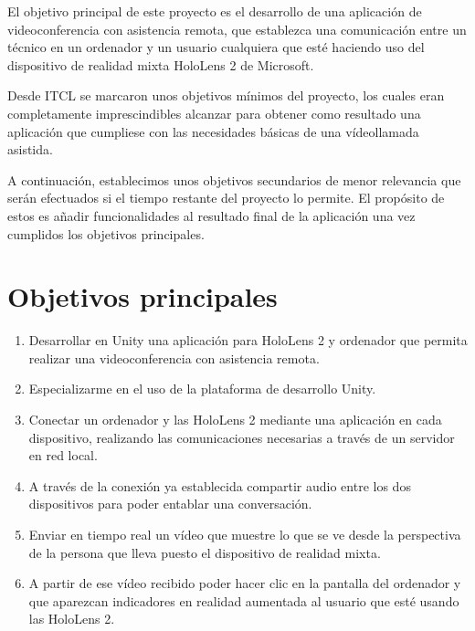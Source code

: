 
El objetivo principal de este proyecto es el desarrollo de una aplicación de videoconferencia con asistencia remota, que establezca una comunicación entre un técnico en un ordenador y un usuario cualquiera que esté haciendo uso del dispositivo de realidad mixta HoloLens 2 de Microsoft.

Desde ITCL se marcaron unos objetivos mínimos del proyecto, los cuales eran completamente imprescindibles alcanzar para obtener como resultado una aplicación que cumpliese con las necesidades básicas de una vídeollamada asistida. 

A continuación, establecimos unos objetivos secundarios de menor relevancia que serán efectuados si el tiempo restante del proyecto lo permite. El propósito de estos es añadir funcionalidades al resultado final de la aplicación una vez cumplidos los objetivos principales. 

\section{Objetivos principales}
\begin{enumerate}
	\item Desarrollar en Unity \cite{unity:unity} una aplicación para HoloLens 2 y ordenador que permita realizar una videoconferencia con asistencia remota.
	\item Especializarme en el uso de la plataforma de desarrollo Unity.
	\item Conectar un ordenador y las HoloLens 2 mediante una aplicación en cada dispositivo, realizando las comunicaciones necesarias a través de un servidor en red local.
	\item A través de la conexión ya establecida compartir audio entre los dos dispositivos para poder entablar una conversación.
	\item Enviar en tiempo real un vídeo que muestre lo que se ve desde la perspectiva de la persona que lleva puesto el dispositivo de realidad mixta.
	\item A partir de ese vídeo recibido poder hacer clic en la pantalla del ordenador y que aparezcan indicadores en realidad aumentada al usuario que esté usando las HoloLens 2.
\end{enumerate}
